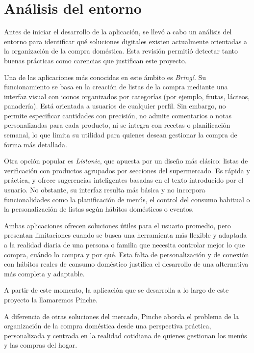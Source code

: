 \section{Análisis del entorno}

Antes de iniciar el desarrollo de la aplicación, se llevó a cabo un análisis del entorno para identificar qué soluciones digitales existen actualmente orientadas a la organización de la compra doméstica. Esta revisión permitió detectar tanto buenas prácticas como carencias que justifican este proyecto.

Una de las aplicaciones más conocidas en este ámbito es \textit{Bring!}. Su funcionamiento se basa en la creación de listas de la compra mediante una interfaz visual con iconos organizados por categorías (por ejemplo, frutas, lácteos, panadería). Está orientada a usuarios de cualquier perfil. Sin embargo, no permite especificar cantidades con precisión, no admite comentarios o notas personalizadas para cada producto, ni se integra con recetas o planificación semanal, lo que limita su utilidad para quienes desean gestionar la compra de forma más detallada.

Otra opción popular es \textit{Listonic}, que apuesta por un diseño más clásico: listas de verificación con productos agrupados por secciones del supermercado. Es rápida y práctica, y ofrece sugerencias inteligentes basadas en el texto introducido por el usuario. No obstante, su interfaz resulta más básica y no incorpora funcionalidades como la planificación de menús, el control del consumo habitual o la personalización de listas según hábitos domésticos o eventos.

Ambas aplicaciones ofrecen soluciones útiles para el usuario promedio, pero presentan limitaciones cuando se busca una herramienta más flexible y adaptada a la realidad diaria de una persona o familia que necesita controlar mejor lo que compra, cuándo lo compra y por qué. Esta falta de personalización y de conexión con hábitos reales de consumo doméstico justifica el desarrollo de una alternativa más completa y adaptable.

A partir de este momento, la aplicación que se desarrolla a lo largo de este proyecto la llamaremos Pinche.

A diferencia de otras soluciones del mercado, Pinche aborda el problema de la organización de la compra doméstica desde una perspectiva práctica, personalizada y centrada en la realidad cotidiana de quienes gestionan los menús y las compras del hogar.

